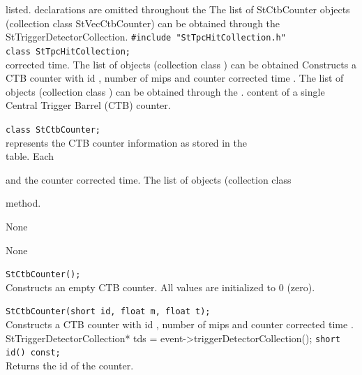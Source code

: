     
listed.   declarations are omitted throughout the
    The list of StCtbCounter objects (collection class StVecCtbCounter) can be obtained
    through the StTriggerDetectorCollection.
    \verb+#include "StTpcHitCollection.h"+\\
    \verb+class StTpcHitCollection;+\\
%
   
    corrected time.
    The list of  objects (collection class ) can be obtained
    Constructs a CTB counter with id , number of mips 
    and counter corrected time .
    The list of  objects (collection class ) can be obtained
    through the .
    content of a single Central Trigger Barrel (CTB) counter.

\item[Synopsis]
    
    \verb+class StCtbCounter;+\\
    
    
     represents the CTB counter information as
    stored in the \\  table. Each
    
    and the counter corrected time.
    The list of  objects (collection class
    
     method.
     
    
\item[Persistence]
    None
    
\item[Related Classes]
    None

\item[Public\\ Constructors]
    \verb+StCtbCounter();+ \\
    Constructs an empty CTB counter. All values are initialized to 0 (zero).

    \verb+StCtbCounter(short id, float m, float t);+ \\
    Constructs a CTB counter with id , number of mips 
    and counter corrected time .
    StTriggerDetectorCollection* tds = event->triggerDetectorCollection();
    \verb+short id() const;+ \\
    Returns the id of the counter.

